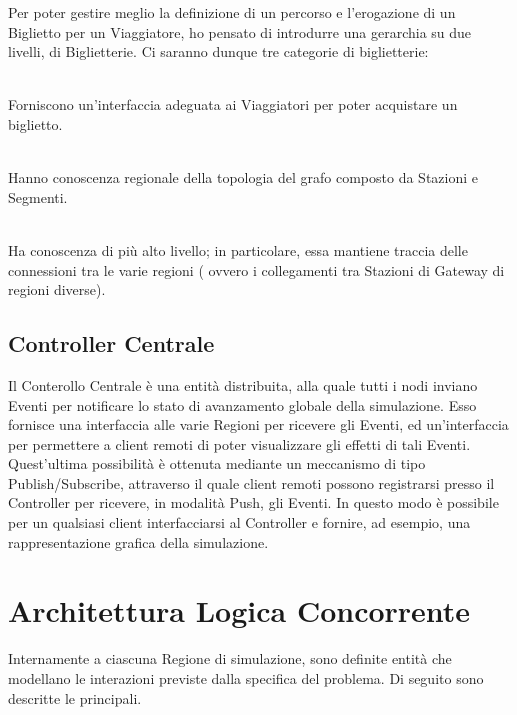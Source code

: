	Per poter gestire meglio la definizione di un percorso e l'erogazione di un Biglietto per un Viaggiatore, ho pensato di introdurre una gerarchia su due livelli, di Biglietterie. Ci saranno dunque tre categorie di biglietterie:
		\begin{description}
			\item {} \\
			Forniscono un'interfaccia adeguata ai Viaggiatori per poter acquistare un biglietto.
			\item {}\\
			Hanno conoscenza regionale della topologia del grafo composto da Stazioni e Segmenti.
			\item {} \\ 
			Ha conoscenza di più alto livello; in particolare, essa mantiene traccia delle connessioni tra le varie regioni ( ovvero i collegamenti tra Stazioni di Gateway di regioni diverse).
		\end{description} 
	
	\subsection{Controller Centrale}
		
	Il Conterollo Centrale è una entità distribuita, alla quale tutti i nodi inviano Eventi per notificare lo stato di avanzamento globale della simulazione. Esso fornisce una interfaccia alle varie Regioni per ricevere gli Eventi, ed un'interfaccia per permettere a client remoti di poter visualizzare gli effetti di tali Eventi. Quest'ultima possibilità è ottenuta mediante un meccanismo di tipo Publish/Subscribe, attraverso il quale client remoti possono registrarsi presso il Controller per ricevere, in modalità Push, gli Eventi.
	In questo modo è possibile per un qualsiasi client interfacciarsi al Controller e fornire, ad esempio, una rappresentazione grafica della simulazione.

\newpage
\section{Architettura Logica Concorrente}

Internamente a ciascuna Regione di simulazione, sono definite entità che modellano le interazioni previste dalla specifica del problema. Di seguito sono descritte le principali.

	
